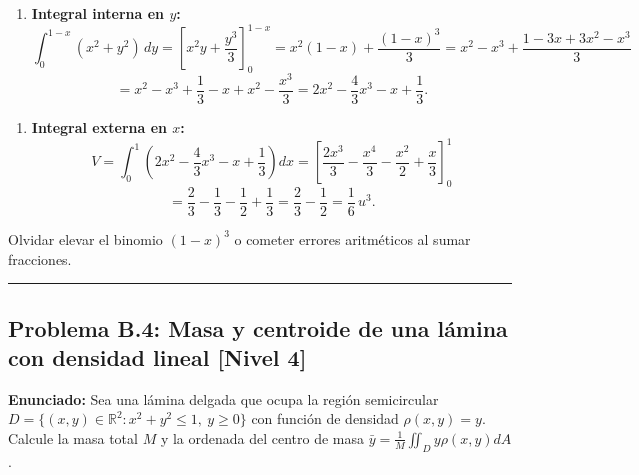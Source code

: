 \documentclass[11pt,a4paper]{article}
\begin{document}
\begin{enumerate}[label=\textbf{\arabic*.}]
\item \textbf{Integral interna en $y$:}
\begin{equation*}
\int_0^{1-x} (x^2 + y^2) \, dy = \left[ x^2 y + \frac{y^3}{3} \right]_0^{1-x} = x^2(1 - x) + \frac{(1 - x)^3}{3} = x^2 - x^3 + \frac{1 - 3x + 3x^2 - x^3}{3}
\end{equation*}
\begin{equation*}
= x^2 - x^3 + \frac{1}{3} - x + x^2 - \frac{x^3}{3} = 2x^2 - \frac{4}{3}x^3 - x + \frac{1}{3}.
\end{equation*}
\end{enumerate}

\begin{enumerate}[label=\textbf{\arabic*.}]
\item \textbf{Integral externa en $x$:}
\begin{equation*}
V = \int_0^1 \left( 2x^2 - \frac{4}{3}x^3 - x + \frac{1}{3} \right) dx = \left[ \frac{2x^3}{3} - \frac{x^4}{3} - \frac{x^2}{2} + \frac{x}{3} \right]_0^1
\end{equation*}
\begin{equation*}
= \frac{2}{3} - \frac{1}{3} - \frac{1}{2} + \frac{1}{3} = \frac{2}{3} - \frac{1}{2} = \frac{1}{6} \, u^3.
\end{equation*}
\end{enumerate}

\begin{trapbox}
Olvidar elevar el binomio $(1-x)^3$ o cometer errores aritméticos al sumar fracciones.
\end{trapbox}

\vspace{0.5cm}
\hrule
\vspace{0.5cm}

\subsection*{Problema B.4: Masa y centroide de una lámina con densidad lineal \hfill \color{primaryblue}\small[Nivel 4]}

\begin{tcolorbox}[colback=white,colframe=gray!40,arc=1mm,boxrule=0.5pt,left=3mm,right=3mm,top=2mm,bottom=2mm]
\textbf{Enunciado:} Sea una lámina delgada que ocupa la región semicircular $D = \{(x,y) \in \mathbb{R}^2 : x^2 + y^2 \le 1, \ y \ge 0\}$ con función de densidad $\rho(x,y) = y$. Calcule la masa total $M$ y la ordenada del centro de masa $\bar{y} = \frac{1}{M}\iint_D y \rho(x,y) dA$.
\end{tcolorbox}
\end{document}
